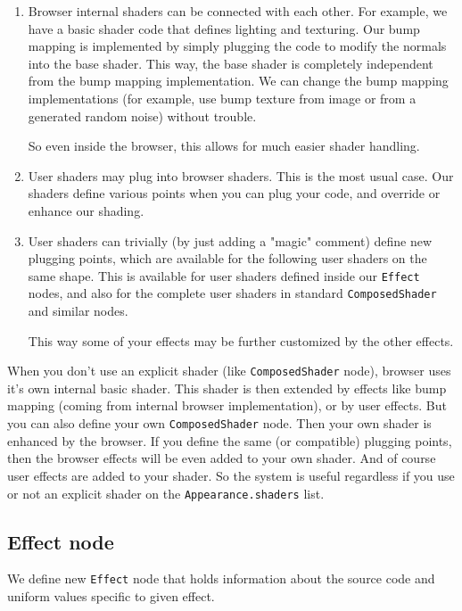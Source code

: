 \documentclass{acmsiggraph}                     %
\newenvironment{myenumerate}
{\begin{enumerate}
  \setlength{\itemsep}{0pt}
  \setlength{\parskip}{0pt}
  \setlength{\parsep}{0pt}}
{\end{enumerate}}
\begin{document}
\begin{myenumerate}
\itemsep 0pt
\item Browser internal shaders can be connected with each other. For example,
we have a basic shader code that defines lighting and texturing. Our bump
mapping is implemented by simply plugging the code to modify the normals
into the base shader. This way, the base shader is completely
independent from the bump mapping implementation. We can change the bump
mapping implementations (for example, use bump texture from image or
from a generated random noise) without trouble.

So even inside the browser, this allows for much easier shader handling.

\item User shaders may plug into browser shaders. This is the most usual
case. Our shaders define various points when you can plug your code,
and override or enhance our shading.

\item User shaders can trivially (by just adding a "magic" comment)
define new plugging points, which are available for the following
user shaders on the same shape. This is available for user shaders
defined inside our \texttt{Effect} nodes, and also for the complete user shaders
in standard \texttt{ComposedShader} and similar nodes.

This way some of your effects may be further customized by the other effects.
\end{myenumerate}

When you don't use an explicit shader (like \texttt{ComposedShader} node),
browser uses it's own internal basic shader. This shader is then
extended by effects like bump mapping (coming from internal browser
implementation), or by user effects. But you can also define your own
\texttt{ComposedShader} node. Then your own shader is enhanced by the
browser. If you define the same (or compatible) plugging
points, then the browser effects will be even added to your own
shader. And of course user effects are added to your shader.
So the system is useful regardless if you use or not an explicit
shader on the \texttt{Appearance.shaders} list.

\subsection{Effect node}

We define new \texttt{Effect} node that holds information about
the source code and uniform values specific to given effect.
\end{document}
